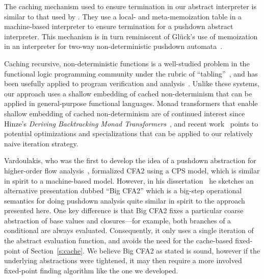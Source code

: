 The caching mechanism used to ensure termination in our abstract interpreter is
similar to that used by \citet{dvanhorn:Johnson2014Abstracting}. They use a local- and
meta-memoization table in a machine-based interpreter to ensure termination for
a pushdown abstract interpreter.  This mechanism is in turn reminiscent of
Gl\"{u}ck's use of memoization in an interpreter for two-way non-deterministic
pushdown automata~\cite{local:gluck-schmidtfest13}.

Caching recursive, non-deterministic functions is a well-studied
problem in the functional logic programming community under the rubric
of ``tabling''~\cite{local:tamaki1986old, local:bol1993tabulated,
  local:chen1996tabled, local:swift2012xsb}, and has been usefully
applied to program verification and
analysis~\cite{local:dawson1996practical,
  local:janssens1998use}. Unlike these systems, our approach uses a
shallow embedding of cached non-determinism that can be applied in
general-purpose functional languages.
%
Monad transformers that enable shallow embedding of cached non-determinism are
of continued interest since Hinze's \emph{Deriving Backtracking Monad
  Transformers}~\cite{local:hinze2000deriving, local:kiselyov2005backtracking,
  local:fischer2011purely}, and recent work~\cite{local:ploeg2014reflection,
  local:vandenbroucke2016fixing} points to potential optimizations and
specializations that can be applied to our relatively naive iteration strategy.

Vardoulakis, who was the first to develop the idea of a pushdown abstraction
for higher-order flow analysis~\cite{dvanhorn:Vardoulakis2011CFA2}, formalized
CFA2 using a CPS model, which is similar in spirit to a machine-based model.
However, in his dissertation~\cite{local:vardoulakis-diss12} he sketches an
alternative presentation dubbed ``Big CFA2'' which is a big-step operational
semantics for doing pushdown analysis quite similar in spirit to the approach
presented here.  One key difference is that Big CFA2 fixes a particular coarse
abstraction of base values and closures---for example, both branches of a
conditional are always evaluated.  Consequently, it only uses a single
iteration of the abstract evaluation function, and avoids the need for the
cache-based fixed-point of Section~\ref{s:cache}.  We believe Big CFA2 as
stated is sound, however if the underlying abstractions were tightened, it
may then require a more involved fixed-point finding algorithm like the one we
developed.

